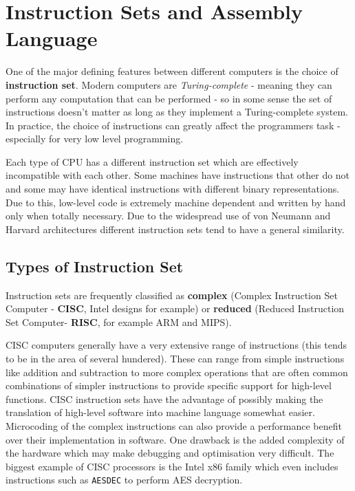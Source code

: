 \documentclass{article}
\begin{document}
	\section{Instruction Sets and Assembly Language}
	One of the major defining features between different computers is the choice of \textbf{instruction set}. Modern computers are \textit{Turing-complete} - meaning they can perform any computation that can be performed - so in some sense the set of instructions doesn't matter as long as they implement a Turing-complete system. In practice, the choice of instructions can greatly affect the programmers task - especially for very low level programming.
	
	\par 
	Each type of CPU has a different instruction set which are effectively incompatible with each other. Some machines have instructions that other do not and some may have identical instructions with different binary representations. Due to this, low-level code is extremely machine dependent and written by hand only when totally necessary. Due to the widespread use of von Neumann and Harvard architectures different instruction sets tend to have a general similarity.
	
	\subsection{Types of Instruction Set}
	Instruction sets are frequently classified as \textbf{complex} (Complex Instruction Set Computer - \textbf{CISC}, Intel designs for example) or \textbf{reduced} (Reduced Instruction Set Computer- \textbf{RISC}, for example ARM and MIPS). 
	
	\par	
	CISC computers generally have a very extensive range of instructions (this tends to be in the area of several hundered). These can range from simple instructions like addition and subtraction to more complex operations that are often common combinations of simpler instructions to provide specific support for high-level functions. CISC instruction sets have the advantage of possibly making the translation of high-level software into machine language somewhat easier. Microcoding of the complex instructions can also provide a performance benefit over their implementation in software. One drawback is the added complexity of the hardware which may make debugging and optimisation very difficult. The biggest example of CISC processors is the Intel x86 family which even includes instructions such as \texttt{AESDEC} to perform AES decryption.
	
\end{document}
